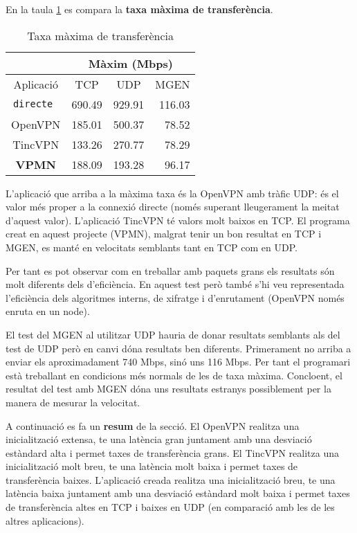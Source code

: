 En la taula \ref{T:tax} es compara la \textbf{taxa màxima de transferència}.
\begin{table}[htb]
\begin{center}
\begin{tabular}{|c|c|c|r|}
\multicolumn{1}{c}{} & \multicolumn{3}{|c|}{Màxim (Mbps)} \\ \hline
Aplicació & TCP & UDP & MGEN \\ \hline \hline
\tt directe & 690.49 & 929.91 & 116.03 \\ \hline
OpenVPN & 185.01 & 500.37 & 78.52 \\ \hline
TincVPN & 133.26 & 270.77 & 78.29 \\ \hline
\bf VPMN & 188.09 & 193.28 & 96.17 \\ \hline
\end{tabular}
\end{center}
\begin{center}
\caption{Taxa màxima de transferència}
\label{T:tax}
\end{center}
\end{table}
L'aplicació que arriba a la màxima taxa és la OpenVPN amb tràfic UDP: és el valor més proper a la connexió directe (només superant lleugerament la meitat d'aquest valor).
L'aplicació TincVPN té valors molt baixos en TCP.
El programa creat en aquest projecte (VPMN), malgrat tenir un bon resultat en TCP i MGEN, es manté en velocitats semblants tant en TCP com en UDP.

Per tant es pot observar com en treballar amb paquets grans els resultats són molt diferents dels d'eficiència. En aquest test però també s'hi veu representada l'eficiència dels algoritmes interns, de xifratge i d'enrutament (OpenVPN només enruta en un node).

El test del MGEN al utilitzar UDP hauria de donar resultats semblants als del test de UDP però en canvi dóna resultats ben diferents. Primerament no arriba a enviar els aproximadament 740 Mbps, sinó uns 116 Mbps. Per tant el programari està treballant en condicions més normals de les de taxa màxima. Concloent, el resultat del test amb MGEN dóna uns resultats estranys possiblement per la manera de mesurar la velocitat.

A continuació es fa un \textbf{resum} de la secció.
El OpenVPN realitza una inicialització extensa, te una latència gran juntament amb una desviació estàndard alta i permet taxes de transferència grans.
El TincVPN realitza una inicialització molt breu, te una latència molt baixa i permet taxes de transferència baixes.
L'aplicació creada realitza una inicialització breu, te una latència baixa juntament amb una desviació estàndard molt baixa i permet taxes de transferència altes en TCP i baixes en UDP (en comparació amb les de les altres aplicacions).
